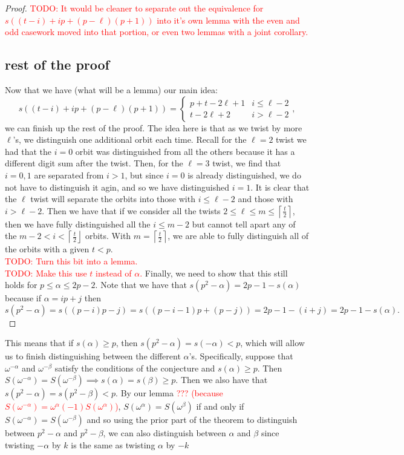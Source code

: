 \begin{proof}
\textcolor{red}{TODO: It would be cleaner to separate out the equivalence for $s((t-i)+ip+(p-\ell)(p+1))$ into it's own lemma with the even and odd casework moved into that portion, or even two lemmas with a joint corollary.}
\\

\subsection{rest of the proof}
Now that we have (what will be a lemma) our main idea:
\[ s((t-i)+ip+(p-\ell)(p+1)) = \begin{cases} p + t-2\ell+1 & i \leq \ell - 2 \\ t - 2 \ell + 2 & i > \ell -2\end{cases},\]
we can finish up the rest of the proof.
The idea here is that as we twist by more $\ell$'s, we distinguish one additional orbit each time.
Recall for the $\ell = 2$ twist we had that the $i = 0$ orbit was distinguished from all the others because it has a different digit sum after the twist.
Then, for the $\ell = 3$ twist, we find that $i=0,1$ are separated from $i > 1$, but since $i =0$ is already distinguished, we do not have to distinguish it agin, and so we have distinguished $i = 1$.
It is clear that the $\ell$ twist will separate the orbits into those with $i \leq \ell - 2$ and those with $i > \ell -2$.
Then we have that if we consider all the twists $2 \leq \ell \leq m \leq \left\lceil \frac{t}{2} \right\rceil$, then we have fully distinguished all the $i \leq m-2$ but cannot tell apart any of the $m-2 < i < \left\lceil \frac{t}{2} \right\rfloor$ orbits.
With $m = \left\lceil \frac{t}{2} \right\rceil$, we are able to fully distinguish all of the orbits with a given $t < p$.
\\
\textcolor{red}{TODO: Turn this bit into a lemma.}
\\
\textcolor{red}{TODO: Make this use $t$ instead of $\alpha$.}
Finally, we need to show that this still holds for $p \leq \alpha \leq 2p - 2$. 
Note that we have that $s(p^2 - \alpha) = 2p-1  - s(\alpha)$ because if $\alpha = ip+j$ then \[s(p^2 -\alpha) = s((p-i)p -j) = s((p -i - 1)p + (p-j) )= 2p-1 - (i+j) = 2p - 1 - s(\alpha).\]
\end{proof}

This means that if $s(\alpha) \geq p$, then $s(p^2 - \alpha) = s(-\alpha) < p$, which will allow us to finish distinguishing between the different $\alpha$'s. 
Specifically, suppose that $\omega^{-\alpha}$ and $\omega^{-\beta}$ satisfy the conditions of the conjecture and $s(\alpha) \geq p$. 
Then $S(\omega^{-\alpha}) = S(\omega^{-\beta}) \implies s(\alpha) = s(\beta) \geq p$. 
Then we also have that $s(p^2 - \alpha) = s(p^2 - \beta) < p$. 
By our lemma \textcolor{red}{??? (because $S(\omega^{-\alpha}) = \omega^{\alpha}(-1)S(\omega^{\alpha})$)}, $S(\omega^\alpha) = S(\omega^\beta)$ if and only if $S(\omega^{-\alpha}) = S(\omega^{-\beta})$ and so using the prior part of the theorem to distinguish between $p^2 - \alpha$ and $p^2 - \beta$, we can also distinguish between $\alpha$ and $\beta$ since twisting $-\alpha$ by $k$ is the same as twisting $\alpha$ by $-k$ 

\endinput
